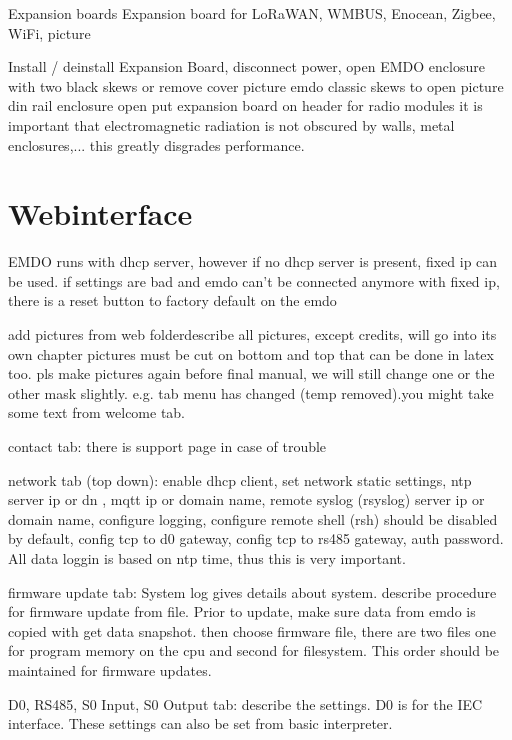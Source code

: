 \documentclass[11pt,fleqn]{book} %
\numberwithin{equation}{section} %
\numberwithin{figure}{section} %
\numberwithin{table}{section} %
\begin{document}
Expansion boards
Expansion board for LoRaWAN, WMBUS, Enocean, Zigbee, WiFi, picture

Install / deinstall Expansion Board, disconnect power, open EMDO enclosure with two black skews or remove cover
picture emdo classic skews to open
picture din rail enclosure open
put expansion board on header
for radio modules it is important that electromagnetic radiation is not obscured by walls, metal enclosures,... this greatly disgrades performance.



\chapter{Webinterface}

EMDO runs with dhcp server, however if no dhcp server is present, fixed ip can be used.
if settings are bad and emdo can't be connected anymore with fixed ip, there is a reset button to factory default on the emdo

add pictures from web folderdescribe all pictures, except credits, will go into its own chapter
pictures must be cut on bottom and top that can be done in latex too. pls make pictures again before final manual, we will still change one or the other mask slightly. e.g. tab menu has changed (temp removed).you might take some text from welcome tab.

contact tab: there is support page in case of trouble

network tab (top down): enable dhcp client, set network static settings, ntp server ip or dn , mqtt ip or domain name, remote syslog (rsyslog) server ip or domain name, configure logging, configure remote shell (rsh) should be disabled by default, config tcp to d0 gateway, config tcp to rs485 gateway, auth password.
All data loggin is based on ntp time, thus this is very important.

firmware update tab: System log gives details about system. describe procedure for firmware update from file. Prior to update, make sure data from emdo is copied with get data snapshot. then choose firmware file, there are two files one for program memory on the cpu and second for filesystem. This order should be maintained for firmware updates. 

D0, RS485, S0 Input, S0 Output tab: describe the settings. D0 is for the IEC interface. These settings can also be set from basic interpreter. 
\end{document}
